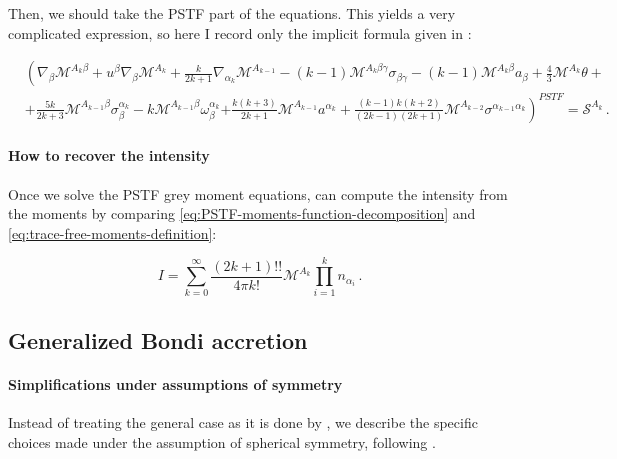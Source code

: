\documentclass[main.tex]{subfiles}
\begin{document}
Then, we should take the PSTF part of the equations. This yields a very complicated expression, so here I record only the implicit formula given in \textcite[eq. 4.11c]{Thorne:1981feb}:

\begin{equation} \label{eq:PSTF-grey-moment-equations}
  \begin{split}
    &\left( \nabla _\beta \mathscr M ^{A_k \beta} + u^\beta \nabla_\beta \mathscr M ^{A_k}
    + \frac{k}{2k+1} \nabla_{\alpha_k} \mathscr M ^{A_{k-1}}
    - (k-1) \mathscr M ^{A_k \beta \gamma} \sigma_{\beta \gamma} \right.
    - (k-1) \mathscr M ^{A_k \beta} a_\beta
    + \frac{4}{3} \mathscr M ^{A_k} \theta + \\
    &+ \frac{5k}{2k+3} \mathscr M ^{A_{k-1} \beta} \sigma_\beta^{\alpha_k}
    - k \mathscr M ^{A_{k-1} \beta} \omega_\beta ^{\alpha_k}
    \left.+ \frac{k (k+3)}{2k+1} \mathscr M ^{A_{k-1}} a^{\alpha_k}
    + \frac{(k-1) k (k+2) }{(2k-1) (2k+1)} \mathscr M ^{A_{k-2}} \sigma^{\alpha_{k-1} \alpha_k} \right)^{PSTF} = \mathscr S ^{A_k} \,.
  \end{split}
\end{equation}

\paragraph{How to recover the intensity}

Once we solve the PSTF grey moment equations, can compute the intensity from the moments by comparing \eqref{eq:PSTF-moments-function-decomposition} and \eqref{eq:trace-free-moments-definition}:

\begin{equation}
  I = \sum _{k=0}   ^{\infty} \frac{(2k+1)!!}{4 \pi k!} \mathscr M^{A_k} \prod_{i=1}^k n_{\alpha_i}\,.
\end{equation}

\subsection{Generalized Bondi accretion}

\paragraph{Simplifications under assumptions of symmetry}

Instead of treating the general case as it is done by \textcite[]{Thorne:1981feb}, we describe the specific choices made under the assumption of spherical symmetry, following \textcite[]{ThorneFLammmangZytkow:1981feb}.
\end{document}

